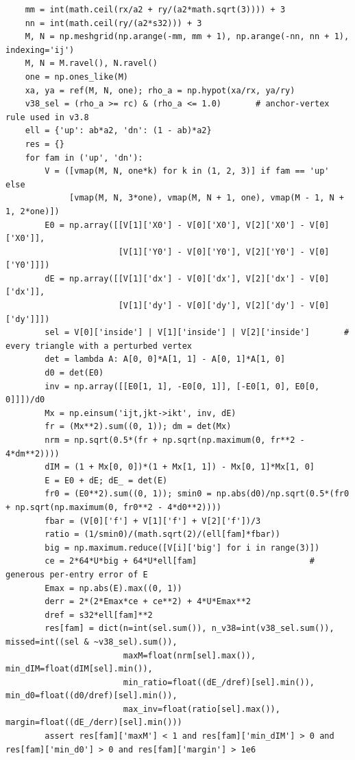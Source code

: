\documentclass[11pt,a4paper]{article}
\theoremstyle{definition}
\theoremstyle{remark}
\begin{document}
\begin{lstlisting}
    mm = int(math.ceil(rx/a2 + ry/(a2*math.sqrt(3)))) + 3
    nn = int(math.ceil(ry/(a2*s32))) + 3
    M, N = np.meshgrid(np.arange(-mm, mm + 1), np.arange(-nn, nn + 1), indexing='ij')
    M, N = M.ravel(), N.ravel()
    one = np.ones_like(M)
    xa, ya = ref(M, N, one); rho_a = np.hypot(xa/rx, ya/ry)
    v38_sel = (rho_a >= rc) & (rho_a <= 1.0)       # anchor-vertex rule used in v3.8
    ell = {'up': ab*a2, 'dn': (1 - ab)*a2}
    res = {}
    for fam in ('up', 'dn'):
        V = ([vmap(M, N, one*k) for k in (1, 2, 3)] if fam == 'up' else
             [vmap(M, N, 3*one), vmap(M, N + 1, one), vmap(M - 1, N + 1, 2*one)])
        E0 = np.array([[V[1]['X0'] - V[0]['X0'], V[2]['X0'] - V[0]['X0']],
                       [V[1]['Y0'] - V[0]['Y0'], V[2]['Y0'] - V[0]['Y0']]])
        dE = np.array([[V[1]['dx'] - V[0]['dx'], V[2]['dx'] - V[0]['dx']],
                       [V[1]['dy'] - V[0]['dy'], V[2]['dy'] - V[0]['dy']]])
        sel = V[0]['inside'] | V[1]['inside'] | V[2]['inside']       # every triangle with a perturbed vertex
        det = lambda A: A[0, 0]*A[1, 1] - A[0, 1]*A[1, 0]
        d0 = det(E0)
        inv = np.array([[E0[1, 1], -E0[0, 1]], [-E0[1, 0], E0[0, 0]]])/d0
        Mx = np.einsum('ijt,jkt->ikt', inv, dE)
        fr = (Mx**2).sum((0, 1)); dm = det(Mx)
        nrm = np.sqrt(0.5*(fr + np.sqrt(np.maximum(0, fr**2 - 4*dm**2))))
        dIM = (1 + Mx[0, 0])*(1 + Mx[1, 1]) - Mx[0, 1]*Mx[1, 0]
        E = E0 + dE; dE_ = det(E)
        fr0 = (E0**2).sum((0, 1)); smin0 = np.abs(d0)/np.sqrt(0.5*(fr0 + np.sqrt(np.maximum(0, fr0**2 - 4*d0**2))))
        fbar = (V[0]['f'] + V[1]['f'] + V[2]['f'])/3
        ratio = (1/smin0)/(math.sqrt(2)/(ell[fam]*fbar))
        big = np.maximum.reduce([V[i]['big'] for i in range(3)])
        ce = 2*64*U*big + 64*U*ell[fam]                       # generous per-entry error of E
        Emax = np.abs(E).max((0, 1))
        derr = 2*(2*Emax*ce + ce**2) + 4*U*Emax**2
        dref = s32*ell[fam]**2
        res[fam] = dict(n=int(sel.sum()), n_v38=int(v38_sel.sum()), missed=int((sel & ~v38_sel).sum()),
                        maxM=float(nrm[sel].max()), min_dIM=float(dIM[sel].min()),
                        min_ratio=float((dE_/dref)[sel].min()), min_d0=float((d0/dref)[sel].min()),
                        max_inv=float(ratio[sel].max()), margin=float((dE_/derr)[sel].min()))
        assert res[fam]['maxM'] < 1 and res[fam]['min_dIM'] > 0 and res[fam]['min_d0'] > 0 and res[fam]['margin'] > 1e6


\end{lstlisting}
\end{document}
